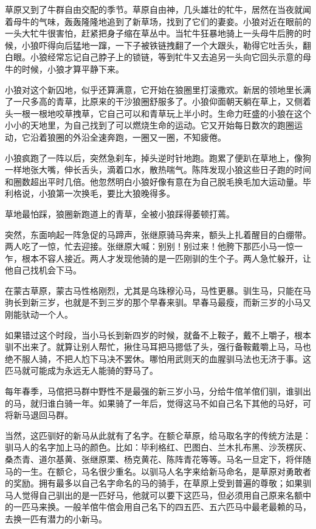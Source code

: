 \par 草原又到了牛群自由交配的季节。草原自由神，几头雄壮的牤牛，居然在当夜就闻着母牛的气味，轰轰隆隆地追到了新草场，找到了它们的妻妾。小狼对近在眼前的一头大牤牛很害怕，赶紧把身子缩在草丛中。当牤牛狂暴地骑上一头母牛后胯的时候，小狼吓得向后猛地一蹿，一下子被铁链拽翻了一个大跟头，勒得它吐舌头，翻白眼。小狼经常忘记自己脖子上的锁链，等到牤牛又去追另一头向它回头示意的母牛的时候，小狼才算平静下来。
\par 小狼对这个新囚地，似乎还算满意，它开始在狼圈里打滚撒欢。新居的领地里长满了一尺多高的青草，比原来的干沙狼圈舒服多了。小狼仰面朝天躺在草上，又侧着头一根一根地咬草拽草，它自己可以和青草玩上半小时。生命力旺盛的小狼在这个小小的天地里，为自己找到了可以燃烧生命的运动。它又开始每日数次的跑圈运动，它沿着狼圈的外沿全速奔跑，一圈又一圈，不知疲倦。
\par 小狼疯跑了一阵以后，突然急刹车，掉头逆时针地跑。跑累了便趴在草地上，像狗一样地张大嘴，伸长舌头，滴着口水，散热喘气。陈阵发现小狼这些日子跑的时间和圈数超出平时几倍。他忽然明白小狼好像有意在为自己脱毛换毛加大运动量。毕利格说，小狼第一次换毛，要比大狼晚得多。
\par 草地最怕踩，狼圈新跑道上的青草，全被小狼踩得萎顿打蔫。
\par 
\par 突然，东面响起一阵急促的马蹄声，张继原骑马奔来，额头上扎着醒目的白绷带。两人吃了一惊，忙去迎接。张继原大喊：别别！别过来！他胯下那匹小马一惊一乍，根本不容人接近。两人才发现他骑的是一匹刚驯的生个子。两人急忙躲开，让他自己找机会下马。
\par 在蒙古草原，蒙古马性格刚烈，尤其是乌珠穆沁马，马性更暴。驯生马，只能在马驹长到新三岁，也就是不到三岁的那个早春来驯。早春马最瘦，而新三岁的小马又刚能驮动一个人。
\par 如果错过这个时段，当小马长到新四岁的时候，就备不上鞍子，戴不上嚼子，根本驯不出来了。就算让别人帮忙，揪住马耳把马摁低了头，强行备鞍戴嚼上马，马也绝不服人骑，不把人尥下马决不罢休。哪怕用武则天的血腥驯马法也无济于事。这匹马就可能成为永远无人能骑的野马了。
\par 每年春季，马倌把马群中野性不是最强的新三岁小马，分给牛倌羊倌们驯，谁驯出的马，就归谁白骑一年。如果骑了一年后，觉得这马不如自己名下其他的马好，可将新马退回马群。
\par 当然，这匹驯好的新马从此就有了名字。在额仑草原，给马取名字的传统方法是：驯马人的名字加上马的颜色。比如：毕利格红、巴图白、兰木扎布黑、沙茨楞灰、桑杰青、道尔基黄、张继原栗、杨克黄花、陈阵青花等等。马名一旦定下，将伴随马的一生。在额仑，马名很少重名。以驯马人名字来给新马命名，是草原对勇敢者的奖励。拥有最多以自己名字命名的马的骑手，在草原上受到普遍的尊敬；如果驯马人觉得自己驯出的是一匹好马，他就可以要下这匹马，但必须用自己原来名额中的一匹马来换。一般羊倌牛倌会用自己名下的四五匹、五六匹马中最老最赖的马，去换一匹有潜力的小新马。
